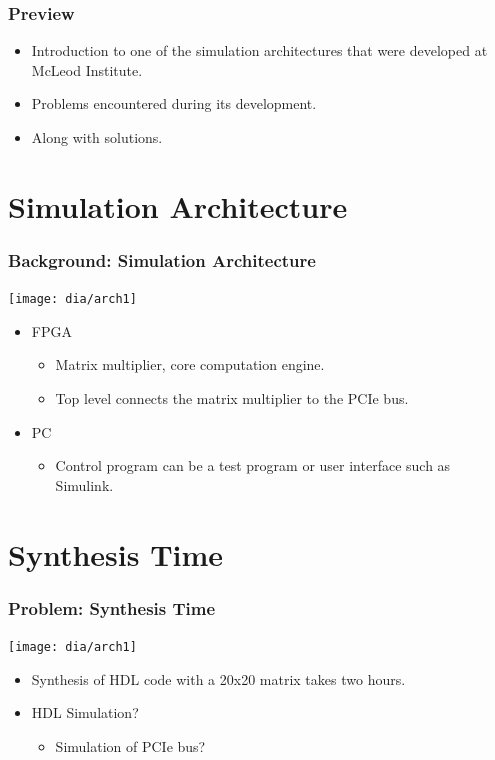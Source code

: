 \documentclass[gray]{beamer}
\begin{document}
\begin{frame}
\frametitle{Preview}
\begin{itemize}
\item Introduction to one of the simulation architectures that were
	developed at McLeod Institute.
\item Problems encountered during its development.
\item Along with solutions.
\end{itemize}
\end{frame}

\section{Simulation Architecture}
\begin{frame}
\frametitle{Background: Simulation Architecture}
\begin{center}
\texttt{[image: dia/arch1]}
\begin{itemize}
\item FPGA
\begin{itemize}
\item Matrix multiplier, core computation engine.
\item Top level connects the matrix multiplier to the PCIe bus.
\end{itemize}
\item PC
\begin{itemize}
\item Control program can be a test program or user interface such as Simulink.
\end{itemize}
\end{itemize}
\end{center}
\end{frame}

\section{Synthesis Time}

\begin{frame}
\frametitle{Problem: Synthesis Time}
\begin{center}
\texttt{[image: dia/arch1]}
\begin{itemize}
\item Synthesis of HDL code with a 20x20 matrix takes two hours.
\item HDL Simulation?
	\begin{itemize}
	\item Simulation of PCIe bus?
	\end{itemize}
\end{itemize}
\end{center}
\end{frame}
\end{document}
